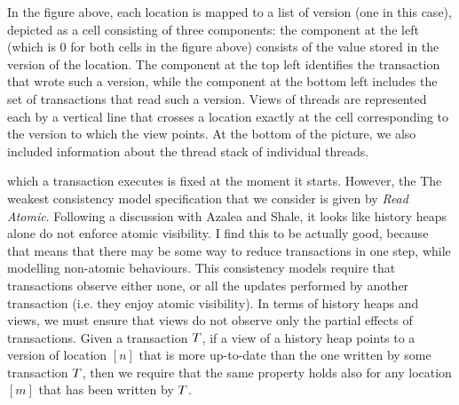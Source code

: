 \begin{example}
\begin{center}
\end{center}
In the figure above, each location is mapped to a list of version (one in this case), depicted as a cell 
consisting of three components: the component at  the left (which is $0$ for both cells in the figure 
above) consists of the value stored in the version of the location. The component at the top 
left identifies the transaction that wrote such a version, while the component at the bottom left 
includes the set of transactions that read such a version. Views of threads are represented each by a vertical  
line that crosses a location exactly at the cell corresponding to the version to which the view points. 
At the bottom of the picture, we also included information about the thread stack of individual threads.



\end{example}
which a transaction executes is fixed at the moment it starts. However, the 
The weakest consistency model specification that we consider is given by \emph{Read Atomic}. 
\ac{Following a discussion with Azalea and Shale, it looks like history heaps alone do not enforce 
atomic visibility. I find this to be actually good, because that means that there may be some way to 
reduce transactions in one step, while modelling non-atomic behaviours}.
This consistency models require that transactions observe either none, or all the updates performed by 
another transaction (i.e. they enjoy atomic visibility). 
In terms of history heaps and views, we must ensure that views do not observe only the partial 
effects of transactions. Given a transaction $T$, if a view of a history heap points to a version of location $[n]$ that 
is more up-to-date than the one written by some transaction $T$, then we require that the 
same property holds also for any location $[m]$ that has been written by $T$.


